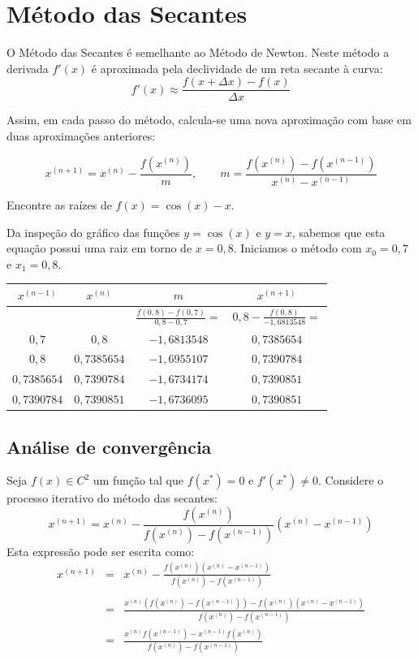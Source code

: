 \section{Método das Secantes}

O Método das Secantes é semelhante ao Método de Newton. Neste método a derivada $f'(x)$ é aproximada pela declividade de um reta secante à curva:
$$f'(x)\approx \frac{f(x+\Delta x)-f(x)}{\Delta x}$$

Assim, em cada passo do método, calcula-se uma nova aproximação com base em duas aproximações anteriores:

$$x^{(n+1)}=x^{(n)} - \frac{f(x^{(n)})}{m}, \qquad m= \frac{f(x^{(n)})-f(x^{(n-1)})}{x^{(n)}-x^{(n-1)}} $$


\begin{ex} Encontre as raízes de $f(x)=\cos(x)-x$.\end{ex}

Da inspeção do gráfico das funções $y=\cos(x)$ e $y=x$, sabemos que esta equação possui uma raiz em torno de $x=0,8$. Iniciamos o método com $x_0=0,7$ e $x_1=0,8$.

\begin{center}
\begin{tabular}{|c|c|c|c|}\hline
$x^{(n-1)}$ & $x^{(n)}$ & $m$ & $x^{(n+1)}$\\\hline
 & & $\frac{f(0,8)-f(0,7)}{0,8-0,7} =$ & $0,8- \frac{f(0,8)}{-1,6813548}=$\\
$0,7$ & $0,8$ & $-1,6813548$ & $0,7385654$\\\hline
$0,8$ & $0,7385654$ & $-1,6955107$ & $0,7390784$ \\\hline
 $0,7385654$ & $0,7390784$ &  $-1,6734174$ & $0,7390851$ \\\hline
$0,7390784$ & $0,7390851$ & $-1,6736095$ & $0,7390851$ \\\hline
\end{tabular}  
\end{center}

\subsection{Análise de convergência}

Seja $f(x)\in C^2$ um função tal que $f(x^*)=0$ e $f'(x^*)\neq 0$. Considere o processo iterativo do método das secantes:
$$x^{(n+1)}=x^{(n)}- \frac{f(x^{(n)})}{f(x^{(n)})-f(x^{(n-1)})}(x^{(n)}-x^{(n-1)})$$
Esta expressão pode ser escrita como:
\begin{eqnarray*}
x^{(n+1)}&=&x^{(n)}- \frac{f(x^{(n)})(x^{(n)}-x^{(n-1)})}{f(x^{(n)})-f(x^{(n-1)})}\\~\\
 &=&\frac{x^{(n)}\left(f(x^{(n)})-f(x^{(n-1)})\right)-f(x^{(n)})(x^{(n)}-x^{(n-1)})}{f(x^{(n)})-f(x^{(n-1)})}\\
 &=&\frac{x^{(n)} f(x^{(n-1)})-x^{(n-1)}f(x^{(n)})}{f(x^{(n)})-f(x^{(n-1)})}
\end{eqnarray*}

